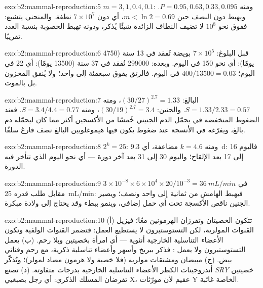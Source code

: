 \begin{solution}{exo:b2:mammal-reproduction:5}
$m = 3, 1, 0.4, 0.1$: ومنه $P = 0.95, 0.63, 0.33, 0.095$. ويهبط دون
النصف حين $m < \ln 2 = 0.69$، أي دون $7\times 10^{7}$ نطفة. والمنحني
يتشبع: ففوق نحو $10^{8}$ لا تضيف النطاف الزائدة شيئًا يُذكر،
ودونه تهبط الخصوبة بنسبة العدد تقريبًا.
\end{solution}

\begin{solution}{exo:b2:mammal-reproduction:6}
قبل البلوغ: $7\times 10^{5}$ بويضة تُفقد في 13 سنة (\num{4750} يومًا):
أي نحو 150 في اليوم. وبعده: \num{299000} تُفقد في 37 سنة (\num{13500}
يومًا): أي 22 في اليوم؛  $400/\num{13500} = 0.03$ في اليوم.
فالرتق يفوق  سبعمئة إلى واحد؛ ولا يُنفق المخزون
 بل بالموت.
\end{solution}

\begin{solution}{exo:b2:mammal-reproduction:7}
البالغ: $(30/27)^{2.7} = 1.33$، ومنه $S = 1.33/2.33 = 0.57$. والجنين:
$(30/19)^{2.7} = 3.4$، ومنه $S = 3.4/4.4 = 0.77$. فعند الضغوط
المنخفضة في  يحمّل الدم الجنيني خُمسًا من الأكسجين أكثر مما
كان ليحمّله دم بالغ، ويفرّغه في الأنسجة عند ضغوط يكون فيها
هيموغلوبين البالغ نصف فارغ سلفًا.
\end{solution}

\begin{solution}{exo:b2:mammal-reproduction:8}
$2^{k} = 25$: ومنه $k = 4.6$ مضاعفة، أي \qty{9.3}{d}: فاليوم 16 إلى 17 بعد
الإلقاح؛ واليوم 30 إلى 31 بعد آخر دورة --- أي نحو اليوم
الذي تتأخر فيه الدورة.
\end{solution}

\begin{solution}{exo:b2:mammal-reproduction:9}
$3\times 10^{-8}\times 6\times 10^{4}\times 20/10^{-3} =
\qty{36}{mL/min}$ في مقابل طلب قدره \qty{25}{mL/min}: فيهبط الهامش
من ثمانية إلى واحد ونصف؛ ويصير الجنين ناقص الأكسجة تحت
أي حمل إضافي، وينمو ببطء وقد يحتاج إلى ولادة مبكرة.
\end{solution}

\begin{solution}{exo:b2:mammal-reproduction:10}
(أ) تتكون الخصيتان وتفرزان الهرمونين معًا؛ فيزيل  القنوات المولرية، لكن التستوستيرون لا يستطيع العمل: فتضمر
القنوات الولفية وتكون الأعضاء التناسلية الخارجية أنثوية --- أي
امرأة بخصيتين وبلا رحم. (ب) يعمل التستوستيرون ولا يعمل : فذكر ببربخ وأسهر وأعضاء تناسلية ذكرية، مع رحم
وقناتي بيض. (ج) مبيضان ومشتقات مولرية (فلا خصية ولا هرمون مضاد
لمولر)؛ وتُذكّر أندروجينات الكظر الأعضاء التناسلية الخارجية بدرجات
متفاوتة. (د) تصنع \emph{SRY} خصيتين تفرضان المسلك الذكري: أي رجل
بصبغيي X، عقيم لأن مورّثات Y الخاصة 
غائبة.
\end{solution}

